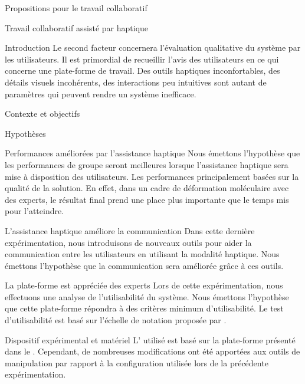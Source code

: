 \documentclass[myfrancais]{mythesis}
\begin{document}
\begin{mypart}{Propositions pour le travail collaboratif}
\begin{mychapter}{Travail collaboratif assisté par haptique}
\begin{mysection}{Introduction}
				Le second facteur concernera l'évaluation qualitative du système par les utilisateurs.
				Il est primordial de recueillir l'avis des utilisateurs en ce qui concerne une plate-forme de travail.
				Des outils haptiques inconfortables, des détails visuels incohérents, des interactions peu intuitives sont autant de paramètres qui peuvent rendre un système inefficace.
			\end{mysection}
			\begin{mysection}{Contexte et objectifs}
				\begin{mysubsection}{Hypothèses}
					\begin{myparagraph}{ Performances améliorées par l'assistance haptique}
						Nous émettons l'hypothèse que les performances de groupe seront meilleures lorsque l'assistance haptique sera mise à disposition des utilisateurs.
						Les performances principalement basées sur la qualité de la solution.
						En effet, dans un cadre de déformation moléculaire avec des experts, le résultat final prend une place plus importante que le temps mis pour l'atteindre.
					\end{myparagraph}
					\begin{myparagraph}{ L'assistance haptique améliore la communication}
						Dans cette dernière expérimentation, nous introduisons de nouveaux outils pour aider la communication entre les utilisateurs en utilisant la modalité haptique.
						Nous émettons l'hypothèse que la communication sera améliorée grâce à ces outils.
					\end{myparagraph}
					\begin{myparagraph}{ La plate-forme est appréciée des experts}
						Lors de cette expérimentation, nous effectuons une analyse de l'utilisabilité du système.
						Nous émettons l'hypothèse que cette plate-forme répondra à des critères minimum d'utilisabilité.
						Le test d'utilisabilité est basé sur l'échelle de notation proposée par .
					\end{myparagraph}
				\end{mysubsection}
			\end{mysection}
			\begin{mysection}{Dispositif expérimental et matériel}
				L' utilisé est basé sur la plate-forme \myShaddock présenté dans le .
				Cependant, de nombreuses modifications ont été apportées aux outils de manipulation par rapport à la configuration utilisée lors de la précédente expérimentation.


\end{mysection}
\end{mychapter}
\end{mypart}
\end{document}
